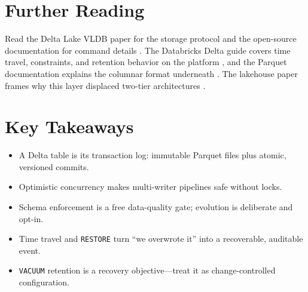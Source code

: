 \section{Further Reading}
Read the Delta Lake VLDB paper for the storage protocol \cite{armbrust2020delta} and the open-source documentation for command details \cite{deltaLakeDocs}. The Databricks Delta guide covers time travel, constraints, and retention behavior on the platform \cite{databricksDelta}, and the Parquet documentation explains the columnar format underneath \cite{apacheParquet}. The lakehouse paper frames why this layer displaced two-tier architectures \cite{armbrust2021lakehouse}.

\section*{Key Takeaways}
\begin{itemize}
    \item A Delta table is its transaction log: immutable Parquet files plus atomic, versioned commits.
    \item Optimistic concurrency makes multi-writer pipelines safe without locks.
    \item Schema enforcement is a free data-quality gate; evolution is deliberate and opt-in.
    \item Time travel and \texttt{RESTORE} turn ``we overwrote it'' into a recoverable, auditable event.
    \item \texttt{VACUUM} retention is a recovery objective---treat it as change-controlled configuration.
\end{itemize}

